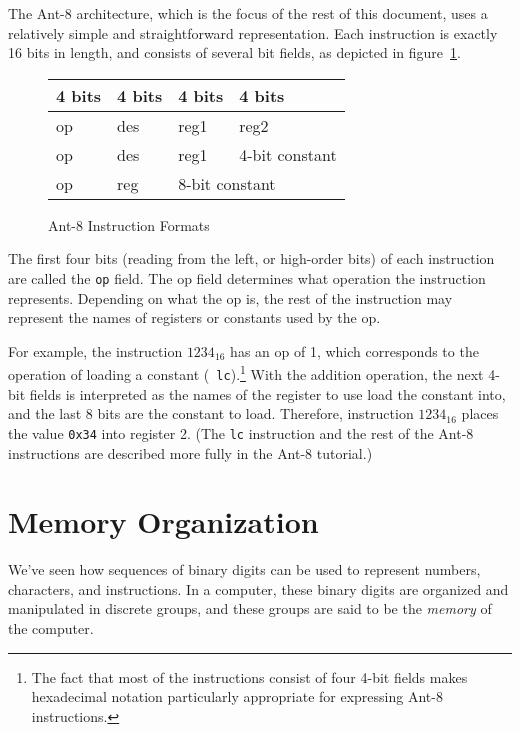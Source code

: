 The {\sc Ant-8} architecture, which is the focus of the rest of this
document, uses a relatively simple and straightforward representation. 
Each instruction is exactly 16 bits in length, and consists of several
bit fields, as depicted in
figure~\ref{datarep-ant-instruction-figure}.

\begin{figure}[hbtp]
\caption{{\sc Ant-8} Instruction Formats}
\label{datarep-ant-instruction-figure}
\begin{center}
\begin{tabular}{|p{1.0in}|p{1.0in}|p{1.0in}|p{1.0in}|}
\hline
4 bits & 4 bits & 4 bits & 4 bits \\
\hline
\hline
op & des & reg1 & reg2 \\
\hline
op & des & reg1 & 4-bit constant \\
\hline
op & reg & \multicolumn{2}{|l|}{8-bit constant} \\
\hline
\end{tabular}
\end{center}
\end{figure}

The first four bits (reading from the left, or high-order bits) of
each instruction are called the {\tt op} field.  The op field
determines what operation the instruction represents.  Depending on
what the op is, the rest of the instruction may represent the names of
registers or constants used by the op.

For example, the instruction $1234_{16}$ has an op of 1, which
corresponds to the operation of loading a constant ({\tt
lc}).\footnote{The fact that most of the instructions consist of four
4-bit fields makes hexadecimal notation particularly appropriate for
expressing {\sc Ant-8} instructions.} With the addition operation, the
next 4-bit fields is interpreted as the names of the register to use
load the constant into, and the last 8 bits are the constant to load. 
Therefore, instruction $1234_{16}$ places the value {\tt 0x34} into
register 2.  (The {\tt lc} instruction and the rest of the {\sc Ant-8}
instructions are described more fully in the {\sc Ant-8} tutorial.)

\section{Memory Organization}

We've seen how sequences of binary digits can be used
to represent numbers, characters, and instructions.
In a computer, these binary digits
are organized and manipulated in discrete groups,
and these groups are said to be the {\em memory} of the computer.

